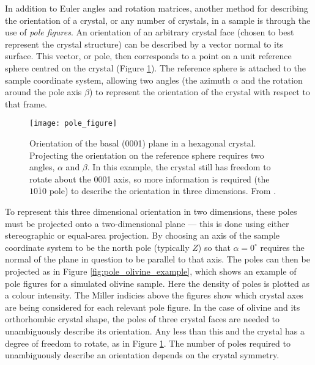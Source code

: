 \documentclass[a4paper,12pt,twoside]{report}
\numberwithin{equation}{chapter}
\begin{document}
In addition to Euler angles and rotation matrices, another method for describing the orientation of a crystal, or any number of crystals, in a sample is through the use of \emph{pole figures}. An orientation of an arbitrary crystal face (chosen to best represent the crystal structure) can be described by a vector normal to its surface. This vector, or pole, then corresponds to a point on a unit reference sphere centred on the crystal (Figure \ref{fig:spherical_orientation}). The reference sphere is attached to the sample coordinate system, allowing two angles (the azimuth $\alpha$ and the rotation around the pole axis $\beta$) to represent the orientation of the crystal with respect to that frame.  




\begin{figure}[h!]
  \centering
    \texttt{[image: pole\_figure]}
  \caption[Pole figure visualisation]{Orientation of the basal (0001) plane in a hexagonal crystal. Projecting the orientation on the reference sphere requires two angles, $\alpha$ and $\beta$. In this example, the crystal still has freedom to rotate about the 0001 axis, so more information is required (the $\mathit{10\overline{1}0}$ pole) to describe the orientation in three dimensions. From \cite{Randle2000}.}
  \label{fig:spherical_orientation}
\end{figure}



To represent this three dimensional orientation in two dimensions, these poles must be projected onto a two-dimensional plane --- this is done using either stereographic or equal-area projection. By choosing an axis of the sample coordinate system to be the north pole (typically $Z$) so that $\alpha = 0^\circ$ requires the normal of the plane in question to be parallel to that axis. The poles can then be projected as in Figure \ref{fig:pole_olivine_example}, which shows an example of pole figures for a simulated olivine sample. Here the density of poles is plotted as a colour intensity. The Miller indicies above the figures show which crystal axes are being considered for each relevant pole figure. In the case of olivine and its orthorhombic crystal shape, the poles of three crystal faces are needed to unambiguously describe its orientation. Any less than this and the crystal has a degree of freedom to rotate, as in Figure \ref{fig:spherical_orientation}. The number of poles required to unambiguously describe an orientation depends on the crystal symmetry.
\end{document}
